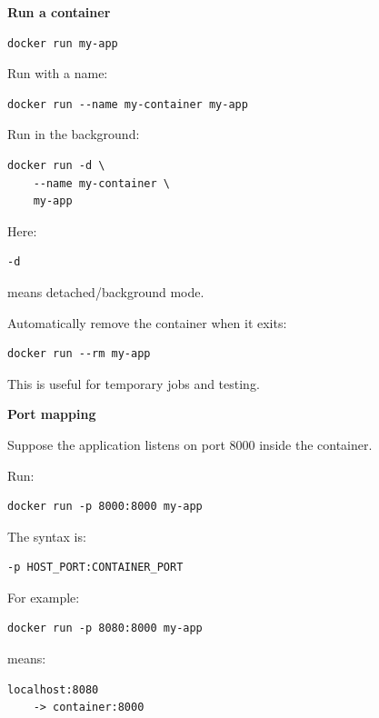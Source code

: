 \documentclass[11pt,letterpaper]{article}
\begin{document}
\textbf{Run a container}

\begin{lstlisting}
docker run my-app
\end{lstlisting}

Run with a name:

\begin{lstlisting}
docker run --name my-container my-app
\end{lstlisting}

Run in the background:

\begin{lstlisting}
docker run -d \
    --name my-container \
    my-app
\end{lstlisting}

Here:

\begin{lstlisting}
-d
\end{lstlisting}

means detached/background mode.

Automatically remove the container when it exits:

\begin{lstlisting}
docker run --rm my-app
\end{lstlisting}

This is useful for temporary jobs and testing.



\textbf{Port mapping}

Suppose the application listens on port 8000 inside the container.

Run:

\begin{lstlisting}
docker run -p 8000:8000 my-app
\end{lstlisting}

The syntax is:

\begin{lstlisting}
-p HOST_PORT:CONTAINER_PORT
\end{lstlisting}

For example:

\begin{lstlisting}
docker run -p 8080:8000 my-app
\end{lstlisting}

means:

\begin{lstlisting}
localhost:8080
    -> container:8000
\end{lstlisting}
\end{document}
